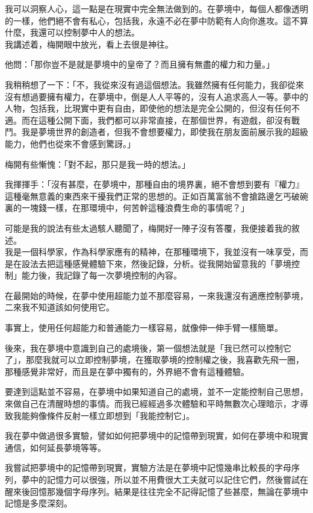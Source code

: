 我可以洞察人心，這一點是在現實中完全無法做到的。在夢境中，每個人都像透明的一樣，他們絕不會有私心，包括我，永遠不必在夢中防範有人向你進攻。這不算什麼，我還可以控制夢中人的想法。
\\

我講述着，梅開眼中放光，看上去很是神往。

他問：「那你豈不是就是夢境中的皇帝了？而且擁有無盡的權力和力量。」

我稍稍想了一下：「不，我從來沒有過這個想法。我雖然擁有任何能力，我卻從來沒有想過要擁有權力，在夢境中，倒是人人平等的，沒有人追求高人一等。夢中的人物，包括我，比現實中更有自由，即使他的想法是完全公開的，但沒有任何不適。而在這種公開下面，我們都可以非常直接，在那個世界，有遊戲，卻沒有戰鬥。我是夢境世界的創造者，但我不會想要權力，即使我在朋友面前展示我的超級能力，他們也從來不會感到驚訝。」

梅開有些慚愧：「對不起，那只是我一時的想法。」

我揮揮手：「沒有甚麼，在夢境中，那種自由的境界裏，絕不會想到要有『權力』這種毫無意義的東西來干擾我們正常的思想的。正如百萬富翁不會搶路邊乞丐破碗裏的一塊錢一樣，在那環境中，何苦幹這種浪費生命的事情呢？」

可能是我的說法有些太過駭人聽聞了，梅開好一陣子沒有答覆，我便接着我的敘述。
\\


我是一個科學家，作為科學家應有的精神，在那種環境下，我並沒有一味享受，而是在設法去把這種感覺體驗下來，然後記錄，分析。從我開始留意我的「夢境控制」能力後，我記錄了每一次夢境控制的內容。

在最開始的時候，在夢中使用超能力並不那麼容易，一來我還沒有適應控制夢境，二來我不知道該如何使用它。

事實上，使用任何超能力和普通能力一樣容易，就像伸一伸手臂一樣簡單。

後來，我在夢境中意識到自己的處境後，第一個想法就是「我已然可以控制它了」，那麼我就可以立即控制夢境，在獲取夢境的控制權之後，我喜歡先飛一圈，那種感覺非常好，而且是在夢中獨有的，外界絕不會有這種體驗。

要達到這點並不容易，在夢境中如果知道自己的處境，並不一定能控制自己思想，來做自己在清醒時想的事情。而我已經經過多次體驗和平時無數次心理暗示，才導致我能夠像條件反射一樣立即想到「我能控制它」。

我在夢中做過很多實驗，譬如如何把夢境中的記憶帶到現實，如何在夢境中和現實通信，如何延長夢境等等。

我嘗試把夢境中的記憶帶到現實，實驗方法是在夢境中記憶幾串比較長的字母序列，夢中的記憶力可以很強，所以並不用費很大工夫就可以記住它們，然後嘗試在醒來後回憶那幾個字母序列。結果是往往完全不記得記憶了些甚麼，無論在夢境中記憶是多麼深刻。


